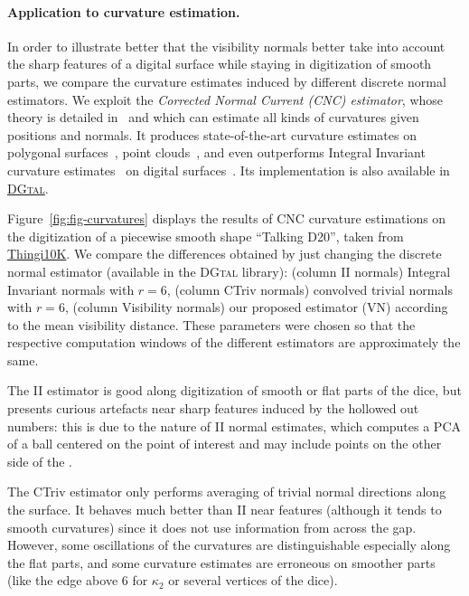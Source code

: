 
\paragraph{Application to curvature estimation.}
In order to illustrate better that the visibility normals better
take into account the sharp features of a digital surface while
staying  in digitization of smooth parts, we compare
the curvature estimates induced by different discrete normal
estimators. We exploit the \emph{Corrected Normal Current (CNC)
    estimator}, whose theory is detailed in~\cite{lachaud:2022-dcg}
and which can estimate all kinds of curvatures given positions and
normals. It produces state-of-the-art curvature estimates on
polygonal surfaces~\cite{lachaud:2020-cgf}, point clouds~\cite{lachaud:2023-cgf}, and even outperforms Integral Invariant
curvature estimates~\cite{coeurjolly:2014-cviu} on digital
surfaces~\cite{lachaud:2022-dcg}. Its implementation is also
available in    \href{https://dgtal-team.github.io/doc-nightly/moduleCurvatureMeasures.html}{\textsc{DGtal}}.

Figure~\ref{fig:fig-curvatures} displays the results of CNC curvature
estimations on the digitization of a piecewise smooth shape
``Talking D20'', taken from
\href{https://ten-thousand-models.appspot.com/detail.html?file_id=1533028}{Thingi10K}.
We compare the differences obtained by just changing the discrete
normal estimator (available in the \textsc{DGtal} library):
(column II normals) Integral Invariant normals with $r=6$, (column
CTriv normals) convolved trivial normals with $r=6$, (column
Visibility normals) our proposed estimator (VN) according to
the mean visibility distance. These parameters were
chosen so that the respective computation windows of the different
estimators are approximately the same.

The II estimator is good along digitization of smooth or flat parts of
the dice, but presents curious artefacts near sharp features
induced by the hollowed out numbers: this is due to the nature of
II normal estimates, which computes a PCA of a ball centered on
the point of interest and may include points on the other side of
the .

The CTriv estimator only performs averaging of trivial normal
directions along the surface. It behaves much better than II near
features (although it tends to smooth curvatures) since it does
not use information from across the gap. However, some oscillations
of the curvatures are distinguishable especially along the flat
parts, and some curvature estimates are erroneous on smoother
parts (like the edge above 6 for $\kappa_2$ or several vertices of the dice).

